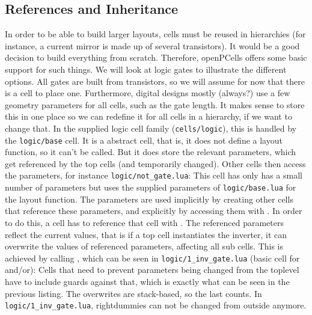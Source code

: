 \subsection{References and Inheritance}
In order to be able to build larger layouts, cells must be reused in hierarchies (for instance, a current mirror is made up of several transistors). It would be
a good decision to build everything from scratch. Therefore, openPCells offers some basic support for such things. We will look at logic gates to illustrate the
different options. All gates are built from transistors, so we will assume for now that there is a cell to place one. Furthermore, digital designs mostly
(always?) use a few geometry parameters for all cells, such as the gate length. It makes sense to store this in one place so we can redefine it for all cells in
a hierarchy, if we want to change that. In the supplied logic cell family (\texttt{cells/logic}), this is handled by the \texttt{logic/base} cell. It is a abstract
cell, that is, it does not define a layout function, so it can't be called. But it does store the relevant parameters, which get referenced by the top cells (and
temporarily changed). Other cells then access the parameters, for instance \texttt{logic/not\_gate.lua}:
This cell has only has a small number of parameters but uses the supplied parameters of \texttt{logic/base.lua} for the layout function. The parameters are used
implicitly by creating other cells that reference these parameters, and explicitly by accessing them with . In order to do this,
a cell has to reference that cell with . The referenced parameters reflect the current values, that is if a top cell instantiates the
inverter, it can overwrite the values of referenced parameters, affecting all sub cells. This is achieved by calling , which can
be seen in \texttt{logic/1\_inv\_gate.lua} (basic cell for and/or):
Cells that need to prevent parameters being changed from the toplevel have to include guards against that, which is exactly what can be seen in the previous
listing. The overwrites are stack-based, so the last  counts. In \texttt{logic/1\_inv\_gate.lua}, rightdummies can not be changed from
outside anymore.
